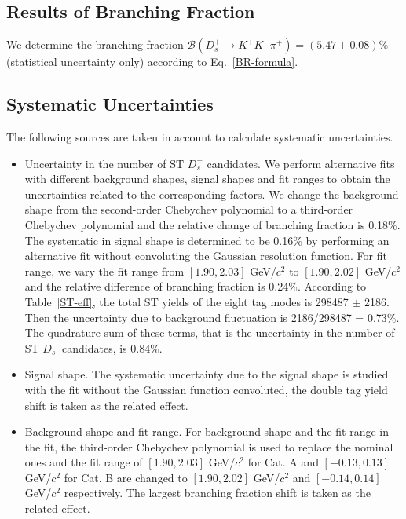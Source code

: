 {    \subsection{Results of Branching Fraction}



    We determine the branching fraction $\mathcal{B}(D_{s}^{+} \rightarrow K^{+}K^{-}\pi^{+})=(5.47\pm0.08)\%$ (statistical uncertainty only) according to Eq.~\ref{BR-formula}.

    \subsection{Systematic Uncertainties}
    The following sources are taken in account to calculate systematic uncertainties.

    \begin{itemize}
        \item Uncertainty in the number of ST $D_{s}^{-}$ candidates. We perform alternative fits with different background shapes, signal shapes and fit ranges to obtain the uncertainties related to the corresponding factors.
            We change the background shape from the second-order Chebychev polynomial to a third-order Chebychev polynomial and the relative change of branching fraction is 0.18\%.
            The systematic in signal shape is determined to be 0.16\% by performing an alternative fit without convoluting the Gaussian resolution function.
            For fit range, we vary the fit range from $[1.90, 2.03]$ GeV/$c^{2}$ to $[1.90, 2.02]$ GeV/$c^{2}$ and the relative difference of branching fraction is 0.24\%.
            According to Table~\ref{ST-eff}, the total ST yields of the eight tag modes is  298487 $\pm$ 2186. Then the uncertainty due to background fluctuation is 2186/298487 = 0.73\%.
            The quadrature sum of these terms, that is the uncertainty in the number of ST $D_{s}^{-}$ candidates, is 0.84\%. 
        
        \item Signal shape. The systematic uncertainty due to the signal shape is studied with the fit without the Gaussian function convoluted, the double tag yield shift is taken as the related effect. 

        \item Background shape and fit range. For background shape and the fit range in the fit, the third-order Chebychev polynomial is used to replace the nominal ones and the fit  range of $[1.90, 2.03]$ GeV/$c^{2}$ for Cat. A and $[-0.13, 0.13]$ GeV/$c^{2}$ for Cat. B are changed to $[1.90, 2.02]$ GeV/$c^{2}$ and $[-0.14, 0.14]$ GeV/$c^{2}$ respectively. 
            The largest branching fraction shift is taken as the related effect.
        

\end{itemize}}
